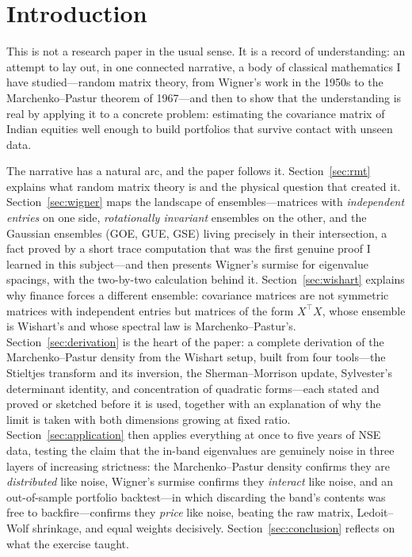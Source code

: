 \documentclass[11pt]{article}
\begin{document}
\section{Introduction}
\label{sec:intro}

This is not a research paper in the usual sense. It is a record of
understanding: an attempt to lay out, in one connected narrative, a body of
classical mathematics I have studied---random matrix theory, from Wigner's
work in the 1950s to the Marchenko--Pastur theorem of 1967---and then to
show that the understanding is real by applying it to a concrete problem:
estimating the covariance matrix of Indian equities well enough
to build portfolios that survive contact with unseen data.

The narrative has a natural arc, and the paper follows it.
Section~\ref{sec:rmt} explains what random matrix theory is and the
physical question that created it. Section~\ref{sec:wigner} maps the
landscape of ensembles---matrices with \emph{independent entries} on one
side, \emph{rotationally invariant} ensembles on the other, and the
Gaussian ensembles (GOE, GUE, GSE) living precisely in their
intersection, a fact proved by a short trace computation that was the
first genuine proof I learned in this subject---and then presents Wigner's
surmise for eigenvalue spacings, with the two-by-two calculation behind
it. Section~\ref{sec:wishart} explains
why finance forces a different ensemble: covariance matrices are not
symmetric matrices with independent entries but matrices of the form
$X^{\top}X$, whose ensemble is Wishart's and whose spectral law is
Marchenko--Pastur's.
Section~\ref{sec:derivation} is the heart of the paper: a complete
derivation of the Marchenko--Pastur density from the Wishart setup, built
from four tools---the Stieltjes transform and its inversion, the
Sherman--Morrison update, Sylvester's determinant identity, and
concentration of quadratic forms---each stated and proved or sketched
before it is used, together with an explanation of why the limit is taken
with both dimensions growing at fixed ratio. Section~\ref{sec:application}
then applies everything at once to five years of NSE data, testing the
claim that the in-band eigenvalues are genuinely noise in three layers of
increasing strictness: the Marchenko--Pastur density confirms they are
\emph{distributed} like noise, Wigner's surmise confirms they
\emph{interact} like noise, and an out-of-sample portfolio backtest---in
which discarding the band's contents was free to backfire---confirms they
\emph{price} like noise, beating the raw matrix, Ledoit--Wolf shrinkage,
and equal weights decisively. Section~\ref{sec:conclusion} reflects on
what the exercise taught.
\end{document}
